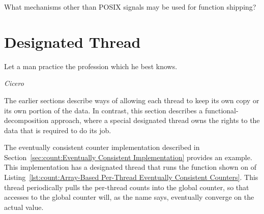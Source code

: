 \QuickQuiz{}
	What mechanisms other than POSIX signals may be used for function
	shipping?
 \QuickQuizEnd

\section{Designated Thread}
\label{sec:owned:Designated Thread}
%
\epigraph{Let a man practice the profession which he best knows.}
	 {\emph{Cicero}}

The earlier sections describe ways of allowing each thread to keep its
own copy or its own portion of the data.
In contrast, this section describes a functional-decomposition approach,
where a special designated thread owns the rights to the data
that is required to do its job.
\begin{fcvref}
The eventually consistent counter implementation described in
Section~\ref{sec:count:Eventually Consistent Implementation} provides an example.
This implementation has a designated thread that runs the
 function shown on  of
Listing~\ref{lst:count:Array-Based Per-Thread Eventually Consistent Counters}.
This  thread periodically pulls the per-thread counts
into the global counter, so that accesses to the global counter will,
as the name says, eventually converge on the actual value.
\end{fcvref}


